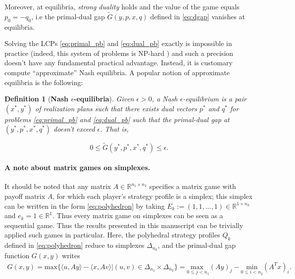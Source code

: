 \documentclass{article} %
\newtheorem{definition}[theorem]{Definition}
\begin{document}
Moreover, at equilibria, \textit{strong duality} holds and the value
of the game equals $p_0 = -q_0$, i.e the primal-dual gap
$\tilde{G}(y, p, x, q)$ defined in \eqref{eq:dgap} vanishes at
equilibria.

Solving the LCPs \eqref{eq:primal_pb} and \eqref{eq:dual_pb} exactly
is impossible in practice (indeed, this system of problems is NP-hard
\cite{koller1992complexity}) and such a precision doesn't have any
fundamental practical advantage. Instead, it is customary compute
``approximate'' Nash equilibria. A popular notion of approximate
equilibria is the following:

\begin{definition}[\textbf{Nash $\epsilon$-equilibria}]
Given $\epsilon > 0$, a Nash $\epsilon$-equilibrium is
a pair $(x^*, y^*)$ of realization plans such that there exists dual
vectors $p^*$ and $q^*$ for problems \eqref{eq:primal_pb} and
\eqref{eq:dual_pb} such that the primal-dual gap at $(y^*, p^*, x^*, q^*)$
doesn't exceed $\epsilon$. That is,

\begin{equation}
  0 \le \tilde{G}(y^*, p^*, x^*, q^*) \le \epsilon.
\label{eq:approx_pb}
\end{equation}
\label{thm:approx_nash}
\end{definition}

\paragraph{A note about matrix games on simplexes.} It should be
noted
that any matrix $A \in \mathbb{R}^{n_1 \times n_2}$ specifies a matrix
  game with payoff matrix $A$, for which each player's strategy
profile is a simplex; this simplex can be written in the form
\eqref{eq:polyhedron} by taking $E_k := (1, 1, ..., 1) \in
\mathbb{R}^{1 \times n_k}$ and $e_k = 1 \in \mathbb{R}^1$. Thus every
matrix game on simplexes can be seen as a sequential game.  Thus the
results presented in this manuscript can be trivially applied such
games in particular. Here, the polyhedral strategy profiles $Q_k$
defined in \eqref{eq:polyhedron} reduce to simplexes $\Delta_{n_k}$,
and the primal-dual gap function $G(x,y)$ writes
\begin{eqnarray}G(x, y) =
\mathrm{max}\{\langle u, Ay\rangle - \langle x, Av\rangle | (u,v) \in
\Delta_{n_1} \times \Delta_{n_2}\} = \underset{0 \le j <
  n_1}{\text{max }}(Ay)_j - \underset{0 \le i < n_2}{\text{min
}}(A^Tx)_i.
\end{eqnarray}
\end{document}
